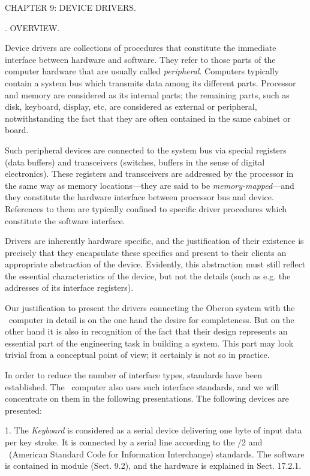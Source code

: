\beginchapter CHAPTER 9: DEVICE DRIVERS.

. OVERVIEW.

Device drivers are collections of procedures that constitute the immediate interface between hardware and software. They refer to those parts of the computer hardware that are usually called \emph{peripheral}. Computers typically contain a system bus which transmits data among its different parts. Processor and memory are considered as its internal parts; the remaining parts, such as disk, keyboard, display, etc, are considered as external or peripheral, notwithstanding the fact that they are often contained in the same cabinet or board.

Such peripheral devices are connected to the system bus via special registers (data buffers) and transceivers (switches, buffers in the sense of digital electronics). These registers and transceivers are addressed by the processor in the same way as memory locations---they are said to be \emph{memory-mapped}---and they constitute the hardware interface between processor bus and device. References to them are typically confined to specific driver procedures which constitute the software interface.

Drivers are inherently hardware specific, and the justification of their existence is precisely that they encapsulate these specifics and present to their clients an appropriate abstraction of the device. Evidently, this abstraction must still reflect the essential characteristics of the device, but not the details (such as e.g. the addresses of its interface registers).

Our justification to present the drivers connecting the Oberon system with the \RISC\ computer in detail is on the one hand the desire for completeness. But on the other hand it is also in recognition of the fact that their design represents an essential part of the engineering task in building a system. This part may look trivial from a conceptual point of view; it certainly is not so in practice.

In order to reduce the number of interface types, standards have been established. The \RISC\ computer also uses such interface standards, and we will concentrate on them in the following presentations. The following devices are presented:

1. The \emph{Keyboard} is considered as a serial device delivering one byte of input data per key stroke. It is connected by a serial line according to the /2 and \ASCII\ (American Standard Code for Information Interchange) standards. The software is contained in module  (Sect. 9.2), and the hardware is explained in Sect. 17.2.1.


